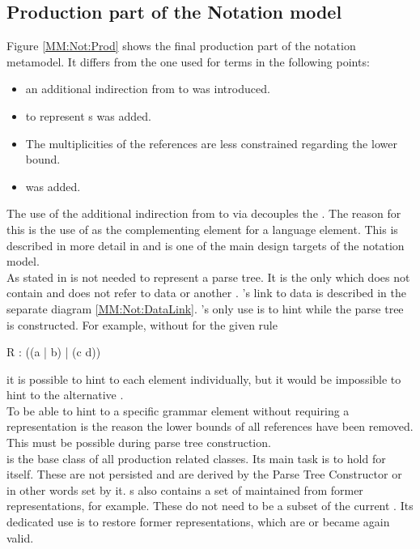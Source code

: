 \subsection{Production part of the Notation model}
Figure \ref{MM:Not:Prod} shows the final production part of the notation metamodel. It differs from the one used for terms in the following points:
\begin{itemize}
	\item an additional indirection from  to  was introduced. 
	\item {} to represent s was added.
	\item The multiplicities of the references are less constrained regarding the lower bound.
	\item {} was added.
\end{itemize}
The use of the additional indirection from  to  via  decouples the . The reason for this is the use of  as the complementing element for a language element. This is described in more detail in  and is one of the main design targets of the notation model.\\
As stated in   is not needed to represent a parse tree. It is the only  which does not contain and does not refer to data or another . 's link to data is described in the separate diagram \ref{MM:Not:DataLink}. 's only use is to hint while the parse tree is constructed. For example, without  for the given rule
\begin{xtxt}
R : ((a | b) | (c d)) 
\end{xtxt}
it is possible to hint to each element individually, but it would be impossible to hint to the alternative . \\
To be able to hint to a specific grammar element without requiring a representation is the reason the lower bounds of all references have been removed. This must be possible during parse tree construction.\\
 is the base class of all production related classes. Its main task is to hold  for itself. These  are not persisted and are derived by the Parse Tree Constructor or in other words set by it. s also contains a set of  maintained from former representations, for example. These do not need to be a subset of the current . Its dedicated use is to restore former representations, which are or became again valid.

